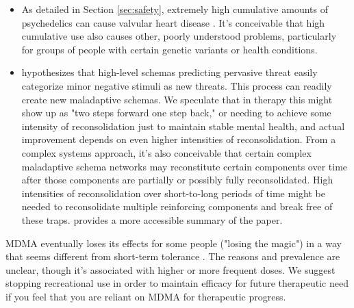 \documentclass[12pt,letterpaper]{book}
\begin{document}
\begin{itemize}
    \item As detailed in Section \ref{sec:safety}, extremely high cumulative amounts of psychedelics can cause valvular heart disease \cite{droogmans2007valvular,tagen2023valvular}. It's conceivable that high cumulative use also causes other, poorly understood problems, particularly for groups of people with certain genetic variants or health conditions.
    \item \textcite{berghSelfEvidencing} hypothesizes that high-level schemas predicting pervasive threat easily categorize minor negative stimuli as new threats. This process can readily create new maladaptive schemas. We speculate that in therapy this might show up as "two steps forward one step back," or needing to achieve some intensity of reconsolidation just to maintain stable mental health, and actual improvement depends on even higher intensities of reconsolidation. From a complex systems approach, it's also conceivable that certain complex maladaptive schema networks may reconstitute certain components over time after those components are partially or possibly fully reconsolidated. High intensities of reconsolidation over short-to-long periods of time might be needed to reconsolidate multiple reinforcing components and break free of these traps. \textcite{alexanderPrecision} provides a more accessible summary of the paper.
\end{itemize}

MDMA eventually loses its effects for some people ("losing the magic") in a way that seems different from short-term tolerance \cite{farreTolerance,parrottTolerance}. The reasons and prevalence are unclear, though it's associated with higher or more frequent doses. We suggest stopping recreational use in order to maintain efficacy for future therapeutic need if you feel that you are reliant on MDMA for therapeutic progress.
\end{document}

